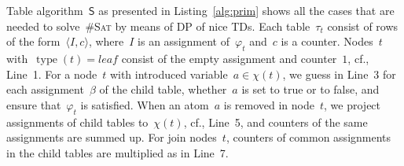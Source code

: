 \documentclass{llncs}
\newcommand{\cSAT}{\textsc{\#Sat}\xspace}%
\newcommand{\algo}[1]{\ensuremath{\mathsf{#1}}}
\newcommand{\tab}[1]{\ensuremath{\tau_{#1}}}
\DeclareMathOperator{\type}{type}
\newcommand{\leaf}{\textit{leaf}}
\begin{document}
%

Table algorithm~$\algo{S}$ as presented in Listing~\ref{alg:prim} shows all the cases that are needed to solve~\cSAT by means of DP of nice TDs.
Each table~$\tab{t}$ consist of rows of the form~$\langle I, c\rangle$,
where~$I$ is an assignment of~$\varphi_t$ and~$c$ is a counter. %
Nodes~$t$ with~$\type(t)=\leaf$ consist of the empty assignment and counter~$1$, cf., Line~1.
For a node~$t$ with introduced variable~$a\in\chi(t)$, we guess in Line~3 for each assignment~$\beta$ of the child table, whether~$a$ is set to true or to false, and ensure that~$\varphi_t$ is satisfied.
When an atom~$a$ is removed in node~$t$, we project assignments of child tables to~$\chi(t)$, cf., Line~5, and counters of the same assignments are summed up.
For join nodes~$t$, counters of common assignments in the child tables are multiplied as in Line~7.
\end{document}
